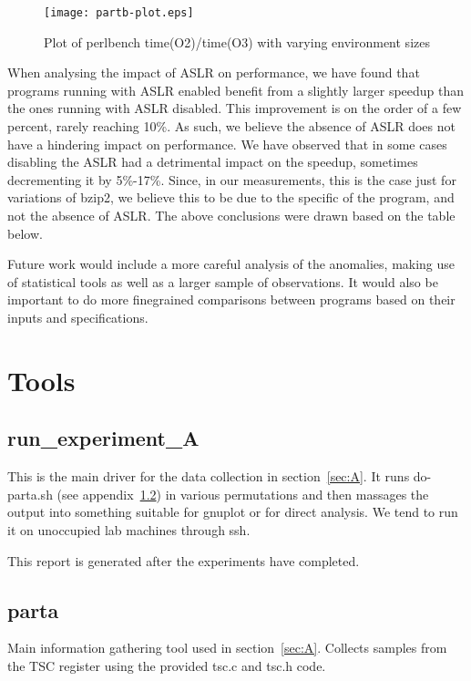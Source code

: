 \documentclass{article}
\begin{document}
\begin{figure}[h]
	\begin{center}
		\texttt{[image: partb-plot.eps]}
	\end{center}		
  \caption{Plot of perlbench time(O2)/time(O3) with varying environment sizes}
\end{figure}

When analysing the impact of ASLR on performance, we have found that programs running with ASLR enabled benefit from a slightly larger speedup than the ones running with ASLR disabled. This improvement is on the order of a few percent, rarely reaching 10\%. As such, we believe the absence of ASLR does not have a hindering impact on performance. We have observed that in some cases disabling the ASLR had a detrimental impact on the speedup, sometimes decrementing it by 5\%-17\%. Since, in our measurements, this is the case just for variations of bzip2, we believe this to be due to the specific of the program, and not the absence of ASLR. The above conclusions were drawn based on the table below.

\begin{framed}
    \label{lst:inactive}
    
\end{framed}


Future work would include a more careful analysis of the anomalies, making use of statistical tools as well as a larger sample of observations. It would also be important to do more finegrained comparisons between programs based on their inputs and specifications.

\newpage
\appendix
\section{Tools}

\subsection{run\_experiment\_A} \label{tool:run}
This is the main driver for the data collection in section~\ref{sec:A}.
It runs do-parta.sh (see appendix~\ref{tool:parta}) in various permutations
and then massages the output into something suitable for gnuplot or for direct
analysis. We tend to run it on unoccupied lab machines through ssh.

This report is generated after the experiments have completed.


\subsection{parta} \label{tool:parta}
Main information gathering tool used in section~\ref{sec:A}. Collects samples
from the TSC register using the provided tsc.c and tsc.h code.
\begin{framed}
    \label{lst:parta}
    
\end{framed}
\end{document}
